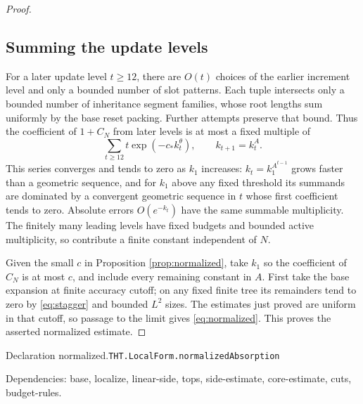 \documentclass[11pt]{article}
\theoremstyle{definition}
\numberwithin{equation}{section}
\newcommand{\bp}[3]{\par\smallskip\begingroup\footnotesize
\noindent\hypertarget{bp:#1}{\textsf{Declaration #1.}}\quad\nolinkurl{#2}\par
\noindent\textsf{Dependencies:} #3.\par\endgroup\smallskip}
\begin{document}
\begin{proof}
\subsection*{Summing the update levels}
For a later update level $t\ge12$, there are $O(t)$ choices of the earlier increment level and only a bounded number of slot patterns. Each tuple intersects only a bounded number of inheritance segment families, whose root lengths sum uniformly by the base reset packing. Further attempts preserve that bound. Thus the coefficient of $1+C_N$ from later levels is at most a fixed multiple of
\[
 \sum_{t\ge12}t\exp(-c_*k_t^\theta),\qquad k_{t+1}=k_t^A.
\]
This series converges and tends to zero as $k_1$ increases: $k_t=k_1^{A^{t-1}}$ grows faster than a geometric sequence, and for $k_1$ above any fixed threshold its summands are dominated by a convergent geometric sequence in $t$ whose first coefficient tends to zero. Absolute errors $O(e^{-k_t})$ have the same summable multiplicity. The finitely many leading levels have fixed budgets and bounded active multiplicity, so contribute a finite constant independent of $N$.

Given the small $c$ in Proposition \ref{prop:normalized}, take $k_1$ so the coefficient of $C_N$ is at most $c$, and include every remaining constant in $A$. First take the base expansion at finite accuracy cutoff; on any fixed finite tree its remainders tend to zero by \eqref{eq:stagger} and bounded $L^2$ sizes. The estimates just proved are uniform in that cutoff, so passage to the limit gives \eqref{eq:normalized}. This proves the asserted normalized estimate.


\end{proof}
\bp{normalized}{THT.LocalForm.normalizedAbsorption}{base, localize, linear-side, tops, side-estimate, core-estimate, cuts, budget-rules}
\end{document}
